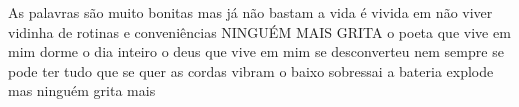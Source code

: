 \begin{poem}
\begin{stanza}
As palavras são muito bonitas\verseline
mas já não bastam\verseline
\qquad a vida é vivida\verseline
\qquad em não viver\verseline
vidinha de rotinas\verseline
e conveniências\verseline
\qquad NINGUÉM MAIS GRITA\verseline
o poeta que vive em mim\verseline
dorme o dia inteiro\verseline
\qquad o deus que vive em mim\verseline
\qquad se desconverteu\verseline
nem sempre se pode ter\verseline
tudo que se quer\verseline
\qquad as cordas vibram\verseline
\qquad o baixo sobressai\verseline
\qquad a bateria explode\verseline
\qquad \qquad mas\verseline
ninguém grita mais
\end{stanza}
\end{poem}